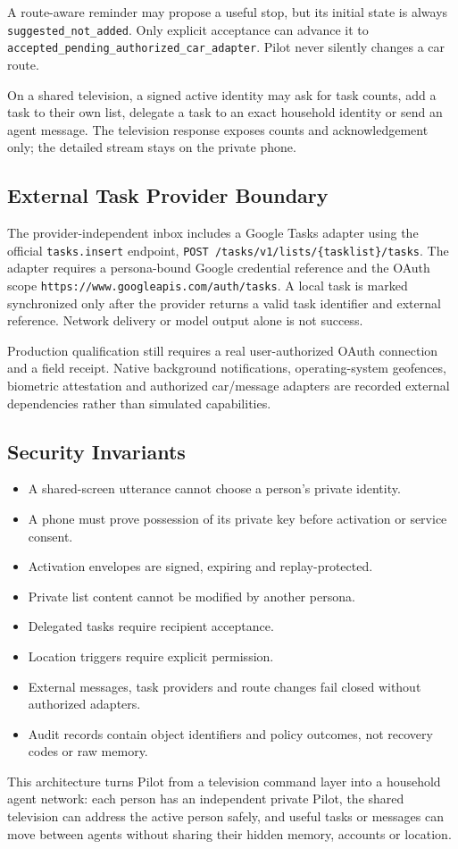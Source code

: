 A route-aware reminder may propose a useful stop, but its initial state is always
\texttt{suggested\_not\_added}. Only explicit acceptance can advance it to
\texttt{accepted\_pending\_authorized\_car\_adapter}. Pilot never silently changes a car
route.

On a shared television, a signed active identity may ask for task counts, add a task to
their own list, delegate a task to an exact household identity or send an agent message.
The television response exposes counts and acknowledgement only; the detailed stream stays
on the private phone.

\subsection{External Task Provider Boundary}

The provider-independent inbox includes a Google Tasks adapter using the official
\texttt{tasks.insert} endpoint,
\texttt{POST /tasks/v1/lists/\{tasklist\}/tasks}. The adapter requires a persona-bound
Google credential reference and the OAuth scope
\texttt{https://www.googleapis.com/auth/tasks}. A local task is marked synchronized only
after the provider returns a valid task identifier and external reference. Network delivery
or model output alone is not success.

Production qualification still requires a real user-authorized OAuth connection and a
field receipt. Native background notifications, operating-system geofences, biometric
attestation and authorized car/message adapters are recorded external dependencies rather
than simulated capabilities.

\subsection{Security Invariants}

\begin{itemize}
  \item A shared-screen utterance cannot choose a person's private identity.
  \item A phone must prove possession of its private key before activation or service consent.
  \item Activation envelopes are signed, expiring and replay-protected.
  \item Private list content cannot be modified by another persona.
  \item Delegated tasks require recipient acceptance.
  \item Location triggers require explicit permission.
  \item External messages, task providers and route changes fail closed without authorized adapters.
  \item Audit records contain object identifiers and policy outcomes, not recovery codes or raw memory.
\end{itemize}

This architecture turns Pilot from a television command layer into a household agent
network: each person has an independent private Pilot, the shared television can address
the active person safely, and useful tasks or messages can move between agents without
sharing their hidden memory, accounts or location.
